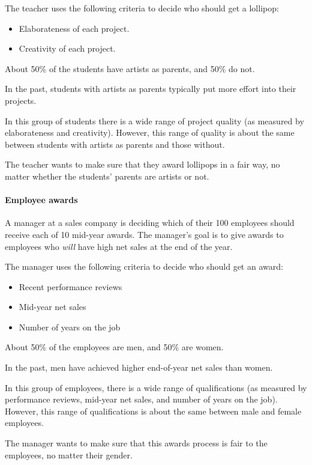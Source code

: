 \documentclass{article}
\begin{document}
The teacher uses the following criteria to decide who should get a lollipop:
\begin{itemize}
    \item Elaborateness of each project.
    \item Creativity of each project.
\end{itemize}

About 50\% of the students have artists as parents, and 50\% do not.  

In the past, students with artists as parents typically put more effort into their projects. 

In this group of students there is a wide range of project quality (as measured by elaborateness and creativity). However, this range of quality is about the same between students with artists as parents and those without.

The teacher wants to make sure that they award lollipops in a fair way, no matter whether the students’ parents are artists or not.

\paragraph{Employee awards}
A manager at a sales company is deciding which of their 100 employees should receive each of 10 mid-year awards. The manager’s goal is to give awards to employees who \emph{will} have high net sales at the end of the year. 

The manager uses the following criteria to decide who should get an award:
\begin{itemize}
    \item Recent performance reviews
    \item Mid-year net sales
    \item Number of years on the job
\end{itemize}


About 50\% of the employees are men, and 50\% are women.  

In the past, men have achieved higher end-of-year net sales than women.

In this group of employees, there is a wide range of qualifications (as measured by performance reviews, mid-year net sales, and number of years on the job). However, this range of qualifications is about the same between male and female employees.

The manager wants to make sure that this awards process is fair to the employees, no matter their gender. 
\end{document}
